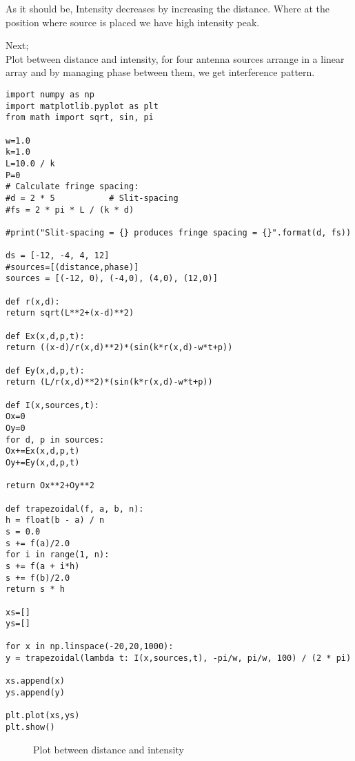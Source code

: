 \begin{flushleft}
	As it should be, Intensity decreases by increasing the distance. Where at the position where source is placed we have high intensity peak.
\end{flushleft}
Next;\\
Plot between distance and intensity, for four antenna sources arrange in a linear array and by managing phase between them, we get interference pattern.
\begin{verbatim}
import numpy as np
import matplotlib.pyplot as plt
from math import sqrt, sin, pi

w=1.0
k=1.0
L=10.0 / k
P=0
# Calculate fringe spacing:
#d = 2 * 5           # Slit-spacing
#fs = 2 * pi * L / (k * d)

#print("Slit-spacing = {} produces fringe spacing = {}".format(d, fs))

ds = [-12, -4, 4, 12]
#sources=[(distance,phase)]
sources = [(-12, 0), (-4,0), (4,0), (12,0)]

def r(x,d):
return sqrt(L**2+(x-d)**2)

def Ex(x,d,p,t):
return ((x-d)/r(x,d)**2)*(sin(k*r(x,d)-w*t+p))

def Ey(x,d,p,t):
return (L/r(x,d)**2)*(sin(k*r(x,d)-w*t+p))

def I(x,sources,t):
Ox=0
Oy=0
for d, p in sources:
Ox+=Ex(x,d,p,t)
Oy+=Ey(x,d,p,t)

return Ox**2+Oy**2

def trapezoidal(f, a, b, n):
h = float(b - a) / n
s = 0.0
s += f(a)/2.0
for i in range(1, n):
s += f(a + i*h)
s += f(b)/2.0
return s * h

xs=[]
ys=[]

for x in np.linspace(-20,20,1000):
y = trapezoidal(lambda t: I(x,sources,t), -pi/w, pi/w, 100) / (2 * pi)

xs.append(x)
ys.append(y)

plt.plot(xs,ys)
plt.show()   
\end{verbatim}
\begin{figure}[ht]
	\centering	
	\caption{Plot between distance and intensity}
\end{figure}



%
